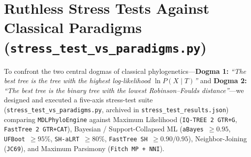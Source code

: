 \documentclass[11pt,a4paper]{article}
\begin{document}
\begin{table}[H]
\centering
\caption{Test 5 --- Empirical Datasets: Resolution, Native Polytomies, Lateral Shunts, Compression Ratio, and Runtime.}
\label{tab:test5}
\end{table}

\section{Ruthless Stress Tests Against Classical Paradigms (\texttt{stress\_test\_vs\_paradigms.py})}

To confront the two central dogmas of classical phylogenetics---\textbf{Dogma 1:} \emph{``The best tree is the tree with the highest log-likelihood $\ln P(X \mid T)$''} and \textbf{Dogma 2:} \emph{``The best tree is the binary tree with the lowest Robinson--Foulds distance''}---we designed and executed a five-axis stress-test suite (\texttt{stress\_test\_vs\_paradigms.py}, archived in \texttt{stress\_test\_results.json}) comparing \texttt{MDLPhyloEngine} against Maximum Likelihood (\texttt{IQ-TREE 2 GTR+G}, \texttt{FastTree 2 GTR+CAT}), Bayesian / Support-Collapsed ML (\texttt{aBayes $\ge 0.95$}, \texttt{UFBoot $\ge 95\%$}, \texttt{SH-aLRT $\ge 80\%$}, \texttt{FastTree SH $\ge 0.90/0.95$}), Neighbor-Joining (\texttt{JC69}), and Maximum Parsimony (\texttt{Fitch MP + NNI}).
\end{document}
